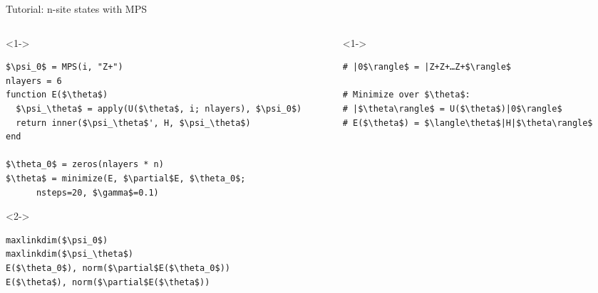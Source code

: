\begin{frame}[fragile]{Tutorial: n-site states with MPS}


\begin{columns}

\begin{column}{5.5cm}

\begin{onlyenv}<1->


\begin{lstlisting}[language=JuliaLocal, style=julia, mathescape, basicstyle=\small]
$\psi_0$ = MPS(i, "Z+")
nlayers = 6
function E($\theta$)
  $\psi_\theta$ = apply(U($\theta$, i; nlayers), $\psi_0$)
  return inner($\psi_\theta$', H, $\psi_\theta$)
end

$\theta_0$ = zeros(nlayers * n)
$\theta$ = minimize(E, $\partial$E, $\theta_0$;
      nsteps=20, $\gamma$=0.1)
\end{lstlisting}

\end{onlyenv}

\begin{onlyenv}<2->

\begin{lstlisting}[language=JuliaLocal, style=julia, mathescape, basicstyle=\small]
maxlinkdim($\psi_0$)
maxlinkdim($\psi_\theta$)
E($\theta_0$), norm($\partial$E($\theta_0$))
E($\theta$), norm($\partial$E($\theta$))
\end{lstlisting}

\end{onlyenv}

\end{column}

\begin{column}{4.5cm}

\begin{onlyenv}<1->

\begin{lstlisting}[style=julia, numbers=none, mathescape, basicstyle=\small]
# |0$\rangle$ = |Z+Z+…Z+$\rangle$

# Minimize over $\theta$:
# |$\theta\rangle$ = U($\theta$)|0$\rangle$
# E($\theta$) = $\langle\theta$|H|$\theta\rangle$





\end{lstlisting}
\end{onlyenv}
\end{column}
\end{columns}
\end{frame}
